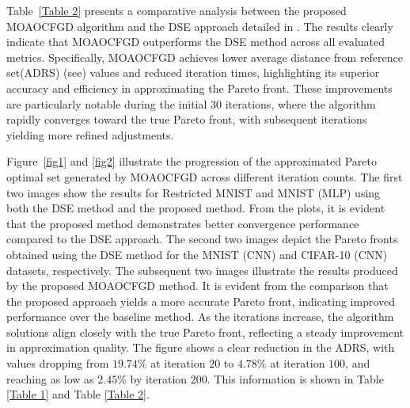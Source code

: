 \documentclass[smallextended,referee,envcountsect]{svjour3}
\begin{document}
Table~\ref{Table 2} presents a comparative analysis between the proposed MOAOCFGD algorithm and the DSE approach detailed in \cite{18}. The results clearly indicate that MOAOCFGD outperforms the DSE method across all evaluated metrics. Specifically, MOAOCFGD achieves lower average distance from reference set(ADRS) (see\cite{18}) values and reduced iteration times, highlighting its superior accuracy and efficiency in approximating the Pareto front. These improvements are particularly notable during the initial 30 iterations, where the algorithm rapidly converges toward the true Pareto front, with subsequent iterations yielding more refined adjustments.

Figure~\ref{fig1} and \ref{fig2} illustrate the progression of the approximated Pareto optimal set generated by MOAOCFGD across different iteration counts. The first two images show the results for Restricted MNIST and MNIST (MLP) using both the DSE method and the proposed method. From the plots, it is evident that the proposed method demonstrates better convergence performance compared to the DSE approach. The second two images depict the Pareto fronts obtained using the DSE method for the MNIST (CNN) and CIFAR-10 (CNN) datasets, respectively. The subsequent two images illustrate the results produced by the proposed MOAOCFGD method. It is evident from the comparison that the proposed approach yields a more accurate  Pareto front, indicating improved performance over the baseline method. As the iterations increase, the algorithm solutions align closely with the true Pareto front, reflecting a steady improvement in approximation quality. The figure shows a clear reduction in the ADRS, with values dropping from $19.74\%$ at iteration $20$ to $4.78\%$ at iteration $100$, and reaching as low as $2.45\%$ by iteration $200$. This information is shown in Table \ref{Table 1} and Table \ref{Table 2}.  
\end{document}
